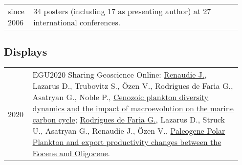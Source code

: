\documentclass[11pt, a4paper]{article}
\begin{document}
\begin{longtable}{p{0.1\linewidth} P{0.85\linewidth}}
since 2006 & 34 posters (including 17 as presenting author) at 27 international conferences.
\end{longtable}
\subsection{Displays}
\begin{longtable}{p{0.1\linewidth} P{0.85\linewidth}}
2020 & EGU2020 Sharing Geoscience Online: \underline{Renaudie J.}, Lazarus D., Trubovitz S., \"{O}zen V., Rodrigues de Faria G., Asatryan G., Noble P., \href{https://meetingorganizer.copernicus.org/EGU2020/EGU2020-3456.html}{Cenozoic plankton diversity dynamics and the impact of macroevolution on the marine carbon cycle}; \underline{Rodrigues de Faria G.}, Lazarus D., Struck U., Asatryan G., Renaudie J., \"{O}zen V., \href{https://meetingorganizer.copernicus.org/EGU2020/EGU2020-5924.html}{Paleogene Polar Plankton and export productivity changes between the Eocene and Oligocene}.\\
\end{longtable}
\end{document}
